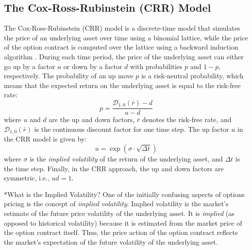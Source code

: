 \documentclass[11pt]{article}
\makeatletter
\theoremstyle{definition}
\renewcommand\subsubsection{\@startsection
	{subsubsection}{2}{0mm}
	{-0.05in}
	{-0.5\baselineskip}
	{\normalfont\normalsize\itshape\bfseries}}
\newcommand{\newterm}[1]{{\it #1}}
\makeatother
\begin{document}
\subsection*{The Cox-Ross-Rubinstein (CRR) Model}
The Cox-Ross-Rubinstein (CRR) model is a discrete-time model that simulates the price of an underlying asset over time
using a binomial lattice, while the price of the option contract is computed over the lattice using a backward induction algorithm \cite{COX1979229}.
During each time period, the price of the underlying asset can either go up by a factor $u$ or down by a factor $d$ 
with probabilities $p$ and $1-p$, respectively. The probability of an up move $p$ is a risk-neutral probability, 
which means that the expected return on the underlying asset is equal to the risk-free rate:
\begin{equation*}
p = \frac{\mathcal{D}_{1,0}(\bar{r}) - d}{u - d}
\end{equation*}
where $u$ and $d$ are the up and down factors, $\bar{r}$ denotes the risk-free rate, and $\mathcal{D}_{1,0}(\bar{r})$ 
is the continuous discount factor for one time step. 
The up factor $u$ in the CRR model is given by:
\begin{equation*}
    u = \exp(\sigma\cdot\sqrt{\Delta{t}})
\end{equation*}
where $\sigma$ is the \newterm{implied volatility} of the return of the underlying asset, and $\Delta{t}$ is the time step. 
Finally, in the CRR approach, the up and down factors are symmetric, i.e., $ud=1$.




\subsubsection*{What is the Implied Volatility?}
One of the initially confusing aspects of options pricing is the concept of \newterm{implied volatility}.
Implied volatility is the market's estimate of the future price volatility of the underlying asset.
It is \textit{implied} (as opposed to historical volatility) because it is estimated from the market price of the option contract itself.
Thus, the price action of the option contract reflects the market's expectation of the future volatility of the underlying asset.
\end{document}
